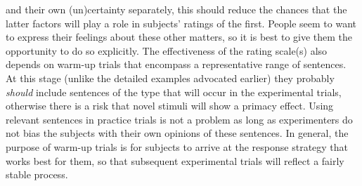   and their own (un)certainty separately, this should reduce the chances that the latter factors will play a role in subjects' ratings of the first. People seem to want to express their feelings about these other matters, so it is best to give them the opportunity to do so explicitly. The effectiveness of the rating scale(s) also depends on warm-up trials that encompass a representative range of sentences. At this stage (unlike the detailed examples advocated earlier) they probably \textit{should} include sentences of the type that will occur in the experimental trials, otherwise there is a risk that novel stimuli will show a primacy effect. Using relevant sentences in practice trials is not a problem as long as experimenters do not bias the subjects with their own opinions of these sentences. In general, the purpose of warm-up trials is for subjects to arrive at the response strategy that works best for them, so that subsequent experimental trials  will reflect a fairly stable process.

